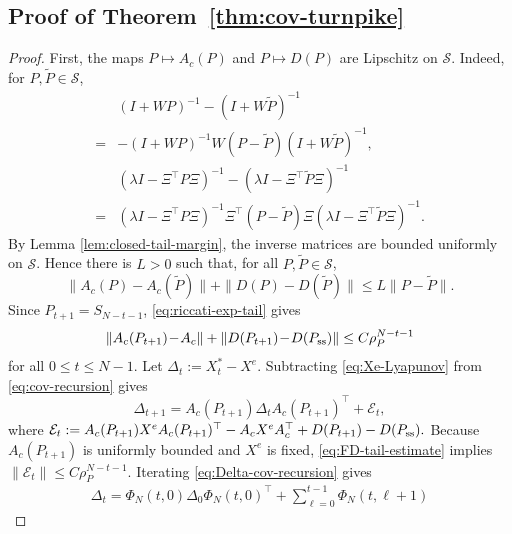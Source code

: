 \documentclass[10pt,journal,twoside]{IEEEtran}
\theoremstyle{definition}
\theoremstyle{remark}
\begin{document}
\subsection{Proof of Theorem~\ref{thm:cov-turnpike}}
\label{app:thm3}

\begin{proof}
	First, the maps \(P\mapsto A_c(P)\) and \(P\mapsto D(P)\) are Lipschitz on
	\(\mathscr S\). Indeed, for \(P,\widetilde P\in\mathscr S\),
	\[
	\begin{aligned}
		&(I+WP)^{-1}-(I+W\widetilde P)^{-1}       \\
		=&-(I+WP)^{-1}
		W(P-\widetilde P)
		(I+W\widetilde P)^{-1},\\
		& (\lambda I-\Xi^\top P\Xi)^{-1}
		-(\lambda I-\Xi^\top \widetilde P\Xi)^{-1} \\
		=&
		(\lambda I-\Xi^\top P\Xi)^{-1}
		\Xi^\top(P-\widetilde P)\Xi
		(\lambda I-\Xi^\top \widetilde P\Xi)^{-1}.
	\end{aligned}
	\]
	By Lemma \ref{lem:closed-tail-margin}, the inverse matrices are bounded uniformly
	on \(\mathscr S\). Hence there is \(L>0\) such that, for all
	\(P,\widetilde P\in\mathscr S\),
	$$
			\|A_c(P)-A_c(\widetilde P)\|
			+\|D(P)-D(\widetilde P)\| \le
			L\|P-\widetilde P\|.
	$$
	Since \(P_{t+1}=S_{N-t-1}\), \eqref{eq:riccati-exp-tail} gives
	\begin{equation}
		\begin{aligned}
			\|A_c(P_{t+1})\!-\!A_c\|
			+\|D(P_{t+1})\!-\!D(P_{\rm ss})\| \le
			C\rho_P^{N-t-1}
		\end{aligned}
		\label{eq:FD-tail-estimate}
	\end{equation}
	for all $0\le t\le N-1$.
	Let \(\Delta_t:=X_t^*-X^e\). Subtracting
	\eqref{eq:Xe-Lyapunov} from \eqref{eq:cov-recursion} gives
	\begin{equation}
		\Delta_{t+1}
		=
		A_c(P_{t+1})
		\Delta_t
		A_c(P_{t+1})^\top
		+
		\mathcal E_t,
		\label{eq:Delta-cov-recursion}
	\end{equation}
	where
	\(
		\mathcal E_t
		:=
		A_c(P_{t+1})X^eA_c(P_{t+1})^\top
		-
		A_cX^eA_c^\top  +
		D(P_{t+1})-D(P_{\rm ss}) .
	\)
	Because \(A_c(P_{t+1})\) is uniformly bounded and \(X^e\) is fixed,
	\eqref{eq:FD-tail-estimate} implies $\|\mathcal E_t\|\le C\rho_P^{N-t-1}$.
	Iterating \eqref{eq:Delta-cov-recursion} gives
	\begin{equation*}
		\begin{aligned}
			\Delta_t
		\!=\!
			\Phi_N(t,0)
			\Delta_0
			\Phi_N(t,0)^\top\!\!\! +\!\!
			\sum_{\ell=0}^{t-1}\!
			\Phi_N(t,\ell\!+\!1)

\end{aligned}
\end{equation*}
\end{proof}
\end{document}
